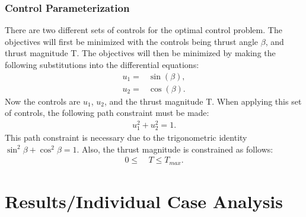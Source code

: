 \documentclass[]{article}
\begin{document}
	\subsubsection{Control Parameterization} \label{Control_Parameratization}
	There are two different sets of controls for the optimal control problem. The objectives will first be minimized with the controls being thrust angle \(\beta\), and thrust magnitude T. The objectives will then be minimized by making the following substitutions into the differential equations:
	\begin{align}                                                                                                                                                                        
    	u_1 =& \sin(\beta), \label{u1_control}\\
    	u_2 =& \cos(\beta). \label{u2_control}
	\end{align}
	Now the controls are \(u_1\), \(u_2\), and the thrust magnitude T. When applying this set of controls, the following path constraint must be made:
	\begin{align}                                                                                                                                                                        
		u_1^2 + u_2^2 = 1. \label{path_constraint}
	\end{align}
	This path constraint is necessary due to the trigonometric identity \(\sin^2\beta + \cos^2\beta =1\). Also, the thrust magnitude is constrained as follows:
    \begin{align*}
		0 \leq&\ T \leq T_{max}.
	\end{align*}
	\section{Results/Individual Case Analysis}
\end{document}
